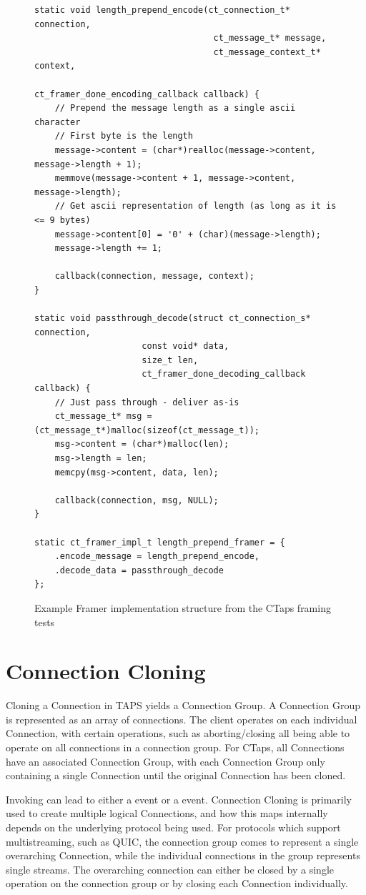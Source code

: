 \begin{figure}[p]
  \begin{verbatim}
static void length_prepend_encode(ct_connection_t* connection,
                                   ct_message_t* message,
                                   ct_message_context_t* context,
                                   ct_framer_done_encoding_callback callback) {
    // Prepend the message length as a single ascii character
    // First byte is the length
    message->content = (char*)realloc(message->content, message->length + 1);
    memmove(message->content + 1, message->content, message->length);
    // Get ascii representation of length (as long as it is <= 9 bytes)
    message->content[0] = '0' + (char)(message->length);
    message->length += 1;

    callback(connection, message, context);
}

static void passthrough_decode(struct ct_connection_s* connection,
                     const void* data,
                     size_t len,
                     ct_framer_done_decoding_callback callback) {
    // Just pass through - deliver as-is
    ct_message_t* msg = (ct_message_t*)malloc(sizeof(ct_message_t));
    msg->content = (char*)malloc(len);
    msg->length = len;
    memcpy(msg->content, data, len);

    callback(connection, msg, NULL);
}

static ct_framer_impl_t length_prepend_framer = {
    .encode_message = length_prepend_encode,
    .decode_data = passthrough_decode
};

  \end{verbatim}
\caption{Example Framer implementation structure from the CTaps framing tests}
\label{fig:framingTestImpl}
\end{figure}

\section{Connection Cloning}
Cloning a Connection in TAPS yields a Connection Group. A Connection Group
is represented as an array of connections. The client operates on each individual
Connection, with certain operations, such as aborting/closing all being able
to operate on all connections in a connection group. For CTaps,
all Connections
have an associated Connection Group, with each Connection Group
only containing a single Connection until the original Connection has been cloned.

Invoking  can lead to either a  event or
a  event. Connection Cloning is primarily used to create
multiple logical Connections, and how this maps internally depends on the
underlying protocol being used. For protocols which support multistreaming,
such as QUIC, the connection group comes to represent a single overarching
Connection, while the individual connections in the group represents single
streams. The overarching connection can either be closed by a single operation
on the connection group or by closing each Connection individually.

